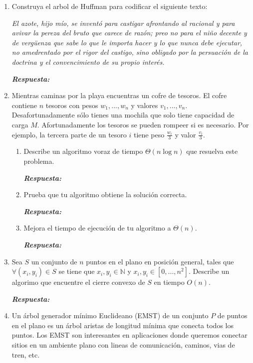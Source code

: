 \documentclass[11pt,letterpaper]{article}
\newcommand\respuesta{\textbf{\textit{Respuesta: }}}
\begin{document}
\begin{enumerate}[leftmargin=*]
    \respuesta

    \item Construya el arbol de Huffman para codificar el siguiente texto:
    
    \textit{El azote, hijo mío, se inventó para castigar afrontando al racional y para avivar la pereza del bruto que carece de razón; preo no para el niño decente y de vergüenza que sabe lo que le importa hacer y lo que nunca debe ejecutar, no amedrentado por el rigor del castigo, sino obligado por la persuación de la doctrina y el convencimiento de su propio interés.}

    \respuesta

    \item Mientras caminas por la playa encuentras un cofre de tesoros.
    El cofre contiene $n$ tesoros con pesos $w_1, ..., w_n$ y valores $v_1, ..., v_n$.
    Desafortunadamente sólo tienes una mochila que solo tiene capacidad de carga $M$.
    Afortunadamente los tesoros se pueden rompeer si es necesario.
    Por ejemplo, la tercera parte de un tesoro $i$ tiene peso $\frac {w_i} 3$ y valor $\frac {v_i} 3$.

    \begin{enumerate}[label=\alph*)]
        \item Describe un algoritmo voraz de tiempo $\Theta (n \log n)$ que resuelva este problema.
        
        \respuesta

        \item Prueba que tu algoritmo obtiene la solución correcta.
        
        \respuesta

        \item Mejora el tiempo de ejecución de tu algoritmo a $\Theta (n)$.
        
        \respuesta
    \end{enumerate}
    
    \item Sea $S$ un conjunto de $n$ puntos en el plano en posición general, tales que $\forall {(x_i, y_i)} \in S$ se tiene que $x_i, y_i \in \mathbb{N}$ y $x_i, y_i \in [0, ..., n^2]$.
    Describe un algorimo que encuentre el cierre convexo de $S$ en tiempo $O(n)$.

    \respuesta

    \item Un árbol generador mínimo Euclideano (EMST) de un conjunto $P$ de puntos en el plano es un árbol aristas de longitud mínima que conecta todos los puntos.
    Los EMST son interesantes en aplicaciones donde queremos conectar sitios en un ambiente plano con lineas de comunicación, caminos, vias de tren, etc.


\end{enumerate}
\end{document}
